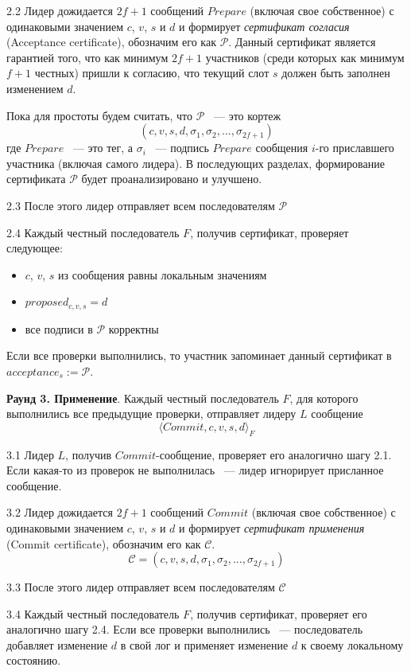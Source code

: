 2.2 Лидер дожидается $2f+1$ сообщений $Prepare$ (включая свое собственное) с одинаковыми значением $c$, $v$, $s$ и $d$ и формирует \textit{сертификат согласия} (Acceptance certificate), обозначим его как $\mathcal{P}$. Данный сертификат является гарантией того, что как минимум $2f+1$ участников (среди которых как минимум $f+1$ честных) пришли к согласию, что текущий слот $s$ должен быть заполнен изменением $d$.

Пока для простоты будем считать, что $\mathcal{P}$ ~--- это кортеж
$$(c, v, s, d, \sigma_1, \sigma_2, ..., \sigma_{2f+1})$$
где $Prepare$ ~--- это тег, а $\sigma_i$ ~--- подпись $Prepare$ сообщения $i$-го приславшего участника (включая самого лидера). 
В последующих разделах, формирование сертификата $\mathcal{P}$ будет проанализировано и улучшено.

2.3 После этого лидер отправляет всем последователям  $\mathcal{P}$

2.4 Каждый честный последователь $F$, получив сертификат, проверяет следующее:
\begin{itemize}
\item $c$, $v$, $s$ из сообщения равны локальным значениям
\item $proposed_{c, v, s} = d$
\item все подписи в $\mathcal{P}$ корректны
\end{itemize}
\vspace{10pt}

Если все проверки выполнились, то участник запоминает данный сертификат в $acceptance_s := \mathcal{P}$.
\vspace{10pt}

\textbf{Раунд 3. Применение}.
Каждый честный последователь $F$, для которого выполнились все предыдущие проверки, отправляет лидеру $L$ сообщение 
\[ \langle Commit, c, v, s, d \rangle_F \]

3.1 Лидер $L$, получив $Commit$-сообщение, проверяет его аналогично шагу 2.1.
Если какая-то из проверок не выполнилась ~--- лидер игнорирует присланное сообщение. 

3.2 Лидер дожидается $2f+1$ сообщений $Commit$ (включая свое собственное) с одинаковыми значением $c$, $v$, $s$ и $d$ и формирует \textit{сертификат применения} (Commit certificate), обозначим его как $\mathcal{C}$.
$$\mathcal{C}=(c, v, s, d, \sigma_1, \sigma_2, ..., \sigma_{2f+1})$$

3.3 После этого лидер отправляет всем последователям $\mathcal{C}$

3.4 Каждый честный последователь $F$, получив сертификат, проверяет его аналогично шагу 2.4.
Если все проверки выполнились ~--- последователь добавляет изменение $d$ в свой лог и применяет изменение $d$ к своему локальному состоянию.

